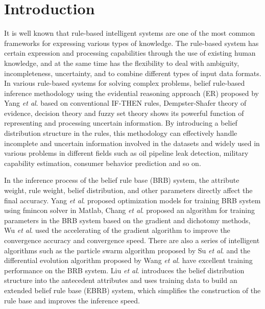 \documentclass{ieeeaccess}
\begin{document}
\maketitle

\section{Introduction}
\label{sec:introduction}

It is well known that rule-based intelligent systems are one of the most common frameworks for expressing various types of knowledge.
The rule-based system has certain expression and processing capabilities through the use of existing human knowledge,
and at the same time has the flexibility to deal with ambiguity, incompleteness, uncertainty, and to combine different types of input data formats.
In various rule-based systems for solving complex problems, belief rule-based inference methodology using the evidential reasoning approach (ER) proposed by Yang \textit{et al}.\cite{a1}
based on conventional IF-THEN rules\cite{a2}, Dempster-Shafer theory of evidence\cite{a3,a4}, decision theory\cite{a5}
and fuzzy set theory\cite{a6} shows its powerful function of representing and processing uncertain information.
By introducing a belief distribution structure in the rules,
this methodology can effectively handle incomplete and uncertain information involved in the datasets and
widely used in various problems in different fields such as
oil pipeline leak detection\cite{a7}, military capability estimation\cite{a8}, consumer behavior prediction\cite{a9} and so on.

In the inference process of the belief rule base (BRB) system, the attribute weight, rule weight, belief distribution, and other parameters
directly affect the final accuracy. Yang \textit{et al}.\cite{a10} proposed optimization models for training BRB system using fmincon solver in
Matlab, Chang \textit{et al}.\cite{a11,a12} proposed an algorithm for training parameters in the BRB system based on the gradient and dichotomy methods,
Wu \textit{et al}.\cite{a13} used the accelerating of the gradient algorithm to improve the convergence accuracy and convergence speed. There are also
a series of intelligent algorithms such as the particle swarm algorithm proposed by Su \textit{et al}.\cite{a14} and the differential evolution
algorithm proposed by Wang \textit{et al}.\cite{a15} have excellent training performance on the BRB system.
Liu \textit{et al}.\cite{a16} introduces the belief distribution structure into the antecedent attributes and
uses training data to build an extended belief rule base (EBRB) system,
which simplifies the construction of the rule base and improves the inference speed.
\end{document}
